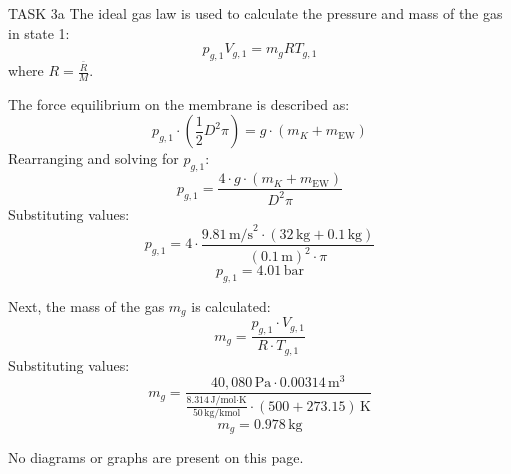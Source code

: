 TASK 3a  
The ideal gas law is used to calculate the pressure and mass of the gas in state 1:  
\[
p_{g,1} V_{g,1} = m_g R T_{g,1}
\]  
where \( R = \frac{\bar{R}}{M} \).  

The force equilibrium on the membrane is described as:  
\[
p_{g,1} \cdot \left( \frac{1}{2} D^2 \pi \right) = g \cdot (m_K + m_{\text{EW}})
\]  
Rearranging and solving for \( p_{g,1} \):  
\[
p_{g,1} = \frac{4 \cdot g \cdot (m_K + m_{\text{EW}})}{D^2 \pi}
\]  
Substituting values:  
\[
p_{g,1} = 4 \cdot \frac{9.81 \, \text{m/s}^2 \cdot (32 \, \text{kg} + 0.1 \, \text{kg})}{(0.1 \, \text{m})^2 \cdot \pi}
\]  
\[
p_{g,1} = 4.01 \, \text{bar}
\]  

Next, the mass of the gas \( m_g \) is calculated:  
\[
m_g = \frac{p_{g,1} \cdot V_{g,1}}{R \cdot T_{g,1}}
\]  
Substituting values:  
\[
m_g = \frac{40,080 \, \text{Pa} \cdot 0.00314 \, \text{m}^3}{\frac{8.314 \, \text{J/mol·K}}{50 \, \text{kg/kmol}} \cdot (500 + 273.15) \, \text{K}}
\]  
\[
m_g = 0.978 \, \text{kg}
\]  

No diagrams or graphs are present on this page.
